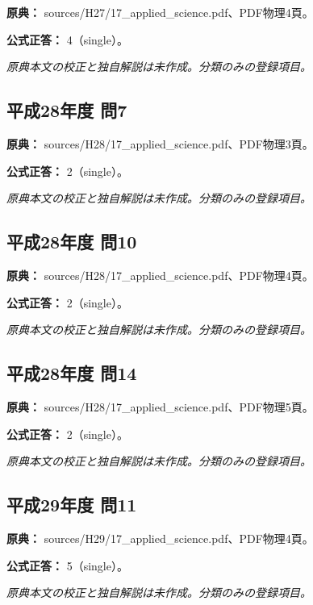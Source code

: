 \noindent\textbf{原典：} sources/H27/17\_applied\_science.pdf、PDF物理4頁。

\textbf{公式正答：} 4（single）。

\par\textit{原典本文の校正と独自解説は未作成。分類のみの登録項目。}

\subsection{平成28年度 問7}
\label{q:h28-reg-applied-07}

\noindent\textbf{原典：} sources/H28/17\_applied\_science.pdf、PDF物理3頁。

\textbf{公式正答：} 2（single）。

\par\textit{原典本文の校正と独自解説は未作成。分類のみの登録項目。}

\subsection{平成28年度 問10}
\label{q:h28-reg-applied-10}

\noindent\textbf{原典：} sources/H28/17\_applied\_science.pdf、PDF物理4頁。

\textbf{公式正答：} 2（single）。

\par\textit{原典本文の校正と独自解説は未作成。分類のみの登録項目。}

\subsection{平成28年度 問14}
\label{q:h28-reg-applied-14}

\noindent\textbf{原典：} sources/H28/17\_applied\_science.pdf、PDF物理5頁。

\textbf{公式正答：} 2（single）。

\par\textit{原典本文の校正と独自解説は未作成。分類のみの登録項目。}

\subsection{平成29年度 問11}
\label{q:h29-reg-applied-11}

\noindent\textbf{原典：} sources/H29/17\_applied\_science.pdf、PDF物理4頁。

\textbf{公式正答：} 5（single）。

\par\textit{原典本文の校正と独自解説は未作成。分類のみの登録項目。}

